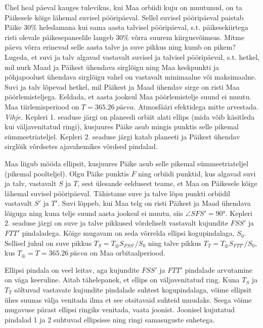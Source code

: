 
Ühel heal päeval kauges tulevikus, kui Maa orbiidi kuju on muutunud, on ta Päikesele
	kõige lähemal suvisel pööripäeval. Sellel suvisel pööripäeval paistab Päike $30\%$
	heledamana kui sama aasta talvisel pööripäeval, s.t. päikesekiirtega risti olevale
	päikesepaneelile langeb $30\%$ võrra suurem kiirgusvõimsus. Mitme päeva võrra erinevad
	selle aasta talve ja suve pikkus ning kumb on pikem? Lugeda, et suvi ja talv algavad
	vastavalt suvisel ja talvisel pööripäeval, s.t. hetkel, mil nurk Maad ja Päikest ühendava
	sirglõigu ning Maa keskpunkti ja põhjapoolust ühendava sirglõigu vahel on vastavalt
	minimaalne või maksimaalne. Suvi ja talv lõpevad hetkel, mil Päikest ja Maad ühendav
	sirge on risti Maa pöörlemisteljega. Eeldada, et aasta jooksul Maa pöörlemistelje suund ei muutu. Maa tiirlemisperiood on $T=\SI{365.26}{päeva}$.
	Atmosfääri efektidega mitte arvestada.\\
	\textit{Vihje.} Kepleri 1. seaduse järgi on planeedi orbiit alati ellips (mida võib käsitleda kui väljavenitatud ringi), kusjuures Päike asub mingis punktis selle pikemal sümmeetriateljel. Kepleri 2. seaduse järgi katab planeeti ja Päikest ühendav sirglõik
	võrdsetes ajavahemikes võrdsed pindalad.
	
	\vspace{-4pt}
	
\hint

\solu
Maa liigub mööda ellipsit, kusjuures Päike asub selle pikemal sümmeetriateljel (pikemal poolteljel). Olgu Päike punktis $F$ ning orbiidi punktid, kus algavad suvi ja talv, vastavalt $S$ ja $T$, sest ülesande eeldusest teame, et Maa on Päikesele kõige lähemal suvisel pööripäeval. Tähistame suve ja talve lõpu punkti orbiidil vastavalt $S'$ ja $T'$. Suvi lõppeb, kui Maa telg on risti Päikest ja Maad ühendava lõiguga ning kuna telje suund aasta jooksul ei muutu, siis $\angle SFS' = \ang{90}$. Kepleri 2. seaduse järgi on suve ja talve pikkused võrdeliselt vastavalt kujundite $FSS'$ ja $FTT'$ pindaladega. Kõige mugavam on seda võrrelda ellipsi kogupindalaga, $S_0$. Sellisel juhul on suve pikkus $T_S = T_\oplus S_{FSS'}/S_0 $ ning talve pikkus $T_T = T_\oplus S_{FTT'}/S_0$, kus $T_\oplus = T =\SI{365.26}{päeva}$ on Maa orbitaalperiood.	

Ellipsi pindala on veel leitav, aga kujundite $FSS'$ ja $FTT'$ pindalade arvutamine on väga keeruline. Aitab tähelepanek, et ellips on väljavenitatud ring. Kuna $T_S$ ja $T_T$ sõltuvad vastavate kujundite pindalade suhtest kogupindalaga, võime ellipsit ühes suunas välja venitada ilma et see otsitavaid suhteid muudaks. Seega võime mugavuse pärast ellipsi ringiks venitada, vaata joonist. Joonisel kujutatud pindalad 1 ja 2 suhtuvad ellipsisse ning ringi samasuguste suhetega.

